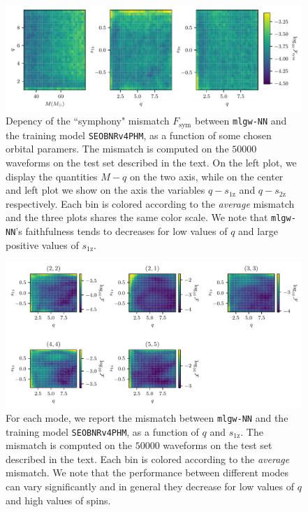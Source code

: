 \documentclass[twocolumn,showpacs,preprintnumbers,nofootinbib,prd,
superscriptaddress,10pt]{revtex4-1}
\begin{document}
\begin{figure}[t]
	\centering
	\includegraphics[width=\textwidth]{colormesh}
	\caption{
	Depency of the ``symphony" mismatch $F_\text{sym}$ between \texttt{mlgw-NN} and the training model \texttt{SEOBNRv4PHM}, as a function of some chosen orbital paramers. The mismatch is computed on the $50000$ waveforms on the test set described in the text.
	On the left plot, we display the quantities $M-q$ on the two axis, while on the center and left plot we show on the axis the variables $q-s_\text{1z}$ and $q-s_\text{2z}$ respectively. 
	Each bin is colored according to the \textit{average} mismatch and the three plots shares the same color scale.
	We note that \texttt{mlgw-NN}'s faithfulness tends to decreases for low values of $q$ and large positive values of $s_\text{1z}$.
	}
	\label{fig:countour_plots}
\end{figure}

\begin{figure}[t]
	\centering
	\includegraphics[width=\textwidth]{colormesh_modes}
	\caption{
	For each mode, we report the mismatch between \texttt{mlgw-NN} and the training model \texttt{SEOBNRv4PHM}, as a function of $q$ and $s_\text{1z}$. The mismatch is computed on the $50000$ waveforms on the test set described in the text.
	Each bin is colored according to the \textit{average} mismatch.
	We note that the performance between different modes can vary significantly and in general they decrease for low values of $q$ and high values of spins.
	}
	\label{fig:countour_plots_modes}
\end{figure}
\end{document}

